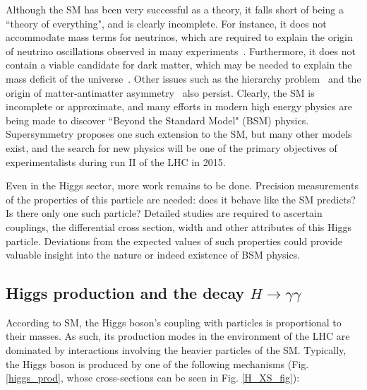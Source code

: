 \documentclass[10pt]{article}
\begin{document}
Although the SM has been very successful as a theory, it falls short of being a “theory of everything", and is clearly incomplete. For instance, it does not accommodate mass terms for neutrinos, which are required to explain the origin of neutrino oscillations observed in many experiments~\cite{SuperK,SNO,DayaBay}. Furthermore, it does not contain a viable candidate for dark matter, which may be needed to explain the mass deficit of the universe~\cite{DM}. Other issues such as the hierarchy problem~\cite{Hierarchy} and the origin of matter-antimatter asymmetry~\cite{Asymmetry} also persist. Clearly, the SM is incomplete or approximate, and many efforts in modern high energy physics are being made to discover “Beyond the Standard Model" (BSM) physics. Supersymmetry proposes one such extension to the SM, but many other models exist, and the search for new physics will be one of the primary objectives of experimentalists during run II of the LHC in 2015.

Even in the Higgs sector, more work remains to be done. Precision measurements of the properties of this particle are needed: does it behave like the SM predicts? Is there only one such particle? Detailed studies are required to ascertain couplings, the differential cross section, width and other attributes of this Higgs particle. Deviations from the expected values of such properties could provide valuable insight into the nature or indeed existence of BSM physics.

\subsection{Higgs production and the decay $H \rightarrow \gamma \gamma$}
According to SM, the Higgs boson's coupling with particles is proportional to their masses. As such, its production modes in the environment of the LHC are dominated by interactions involving the heavier particles of the SM. Typically, the Higgs boson is produced by one of the following mechanisms (Fig. \ref{higgs_prod}, whose cross-sections can be seen in Fig. \ref{H_XS_fig}):
\end{document}
